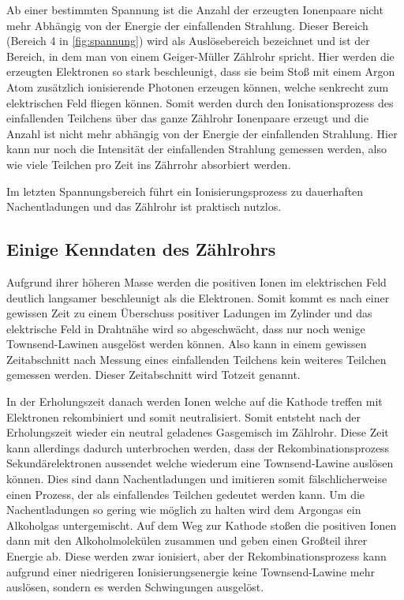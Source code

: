 Ab einer bestimmten Spannung ist die Anzahl der erzeugten Ionenpaare nicht mehr Abhängig von der Energie der einfallenden Strahlung.
Dieser Bereich (Bereich 4 in \autoref{fig:spannung}) wird als Auslösebereich bezeichnet und ist der Bereich, in dem man von einem Geiger-Müller Zählrohr spricht.
Hier werden die erzeugten Elektronen so stark beschleunigt, dass sie beim Stoß mit einem Argon Atom zusätzlich ionisierende Photonen erzeugen können, welche senkrecht zum elektrischen Feld fliegen können.
Somit werden durch den Ionisationsprozess des einfallenden Teilchens über das ganze Zählrohr Ionenpaare erzeugt und die Anzahl ist nicht mehr abhängig von der Energie der einfallenden Strahlung.
Hier kann nur noch die Intensität der einfallenden Strahlung gemessen werden, also wie viele Teilchen pro Zeit ins Zährrohr absorbiert werden.

Im letzten Spannungsbereich führt ein Ionisierungsprozess zu dauerhaften Nachentladungen und das Zählrohr ist praktisch nutzlos.

\subsection{Einige Kenndaten des Zählrohrs}
\label{ssec:totzeit}

Aufgrund ihrer höheren Masse werden die positiven Ionen im elektrischen Feld deutlich langsamer beschleunigt als die Elektronen.
Somit kommt es nach einer gewissen Zeit zu einem Überschuss positiver Ladungen im Zylinder und das elektrische Feld in Drahtnähe wird so abgeschwächt, dass nur noch wenige Townsend-Lawinen ausgelöst werden können.
Also kann in einem gewissen Zeitabschnitt nach Messung eines einfallenden Teilchens kein weiteres Teilchen gemessen werden.
Dieser Zeitabschnitt wird Totzeit genannt.

In der Erholungszeit danach werden Ionen welche auf die Kathode treffen mit Elektronen rekombiniert und somit neutralisiert.
Somit entsteht nach der Erholungszeit wieder ein neutral geladenes Gasgemisch im Zählrohr.
Diese Zeit kann allerdings dadurch unterbrochen werden, dass der Rekombinationsprozess Sekundärelektronen aussendet welche wiederum eine Townsend-Lawine auslösen können.
Dies sind dann Nachentladungen und imitieren somit fälschlicherweise einen Prozess, der als einfallendes Teilchen gedeutet werden kann.
Um die Nachentladungen so gering wie möglich zu halten wird dem Argongas ein Alkoholgas untergemischt.
Auf dem Weg zur Kathode stoßen die positiven Ionen dann mit den Alkoholmolekülen zusammen und geben einen Großteil ihrer Energie ab.
Diese werden zwar ionisiert, aber der Rekombinationsprozess kann aufgrund einer niedrigeren Ionisierungsenergie keine Townsend-Lawine mehr auslösen, sondern es werden Schwingungen ausgelöst.

